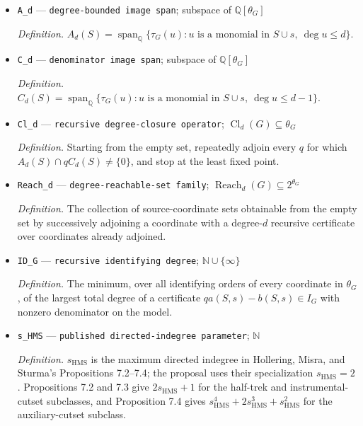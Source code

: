 \documentclass{article}
\begin{document}
\begin{itemize}
  \par\smallskip\noindent\emph{Definition.} \texttt{A total polynomial-\allowbreak{}degree cutoff.}
  \item \texttt{A\_\allowbreak{}d} --- \texttt{degree-\allowbreak{}bounded image span}; subspace of \(\mathbb Q[\theta_G]\)
  \par\smallskip\noindent\emph{Definition.} \(A_d(S)=\operatorname{span}_{\mathbb Q}\{\tau_G(u):u\text{ is a monomial in }S\cup s,\ \deg u\le d\}\).
  \item \texttt{C\_\allowbreak{}d} --- \texttt{denominator image span}; subspace of \(\mathbb Q[\theta_G]\)
  \par\smallskip\noindent\emph{Definition.} \(C_d(S)=\operatorname{span}_{\mathbb Q}\{\tau_G(u):u\text{ is a monomial in }S\cup s,\ \deg u\le d-1\}\).
  \item \texttt{Cl\_\allowbreak{}d} --- \texttt{recursive degree-\allowbreak{}closure operator}; \(\operatorname{Cl}_d(G)\subseteq\theta_G\)
  \par\smallskip\noindent\emph{Definition.} Starting from the empty set, repeatedly adjoin every \(q\) for which \(A_d(S)\cap qC_d(S)\ne\{0\}\), and stop at the least fixed point.
  \item \texttt{Reach\_\allowbreak{}d} --- \texttt{degree-\allowbreak{}reachable-\allowbreak{}set family}; \(\operatorname{Reach}_d(G)\subseteq2^{\theta_G}\)
  \par\smallskip\noindent\emph{Definition.} The collection of source-coordinate sets obtainable from the empty set by successively adjoining a coordinate with a degree-\(d\) recursive certificate over coordinates already adjoined.
  \item \texttt{ID\_\allowbreak{}G} --- \texttt{recursive identifying degree}; \(\mathbb N\cup\{\infty\}\)
  \par\smallskip\noindent\emph{Definition.} The minimum, over all identifying orders of every coordinate in \(\theta_G\), of the largest total degree of a certificate \(q a(S,s)-b(S,s)\in I_G\) with nonzero denominator on the model.
  \item \texttt{s\_\allowbreak{}HMS} --- \texttt{published directed-\allowbreak{}indegree parameter}; \(\mathbb N\)
  \par\smallskip\noindent\emph{Definition.} \(s_{\mathrm{HMS}}\) is the maximum directed indegree in Hollering, Misra, and Sturma's Propositions 7.2--7.4; the proposal uses their specialization \(s_{\mathrm{HMS}}=2\). Propositions 7.2 and 7.3 give \(2s_{\mathrm{HMS}}+1\) for the half-trek and instrumental-cutset subclasses, and Proposition 7.4 gives \(s_{\mathrm{HMS}}^4+2s_{\mathrm{HMS}}^3+s_{\mathrm{HMS}}^2\) for the auxiliary-cutset subclass.

\end{itemize}
\end{document}
